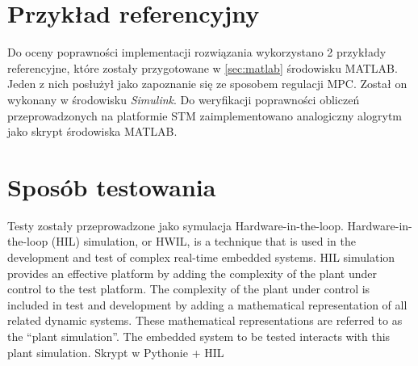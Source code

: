 \section{Przykład referencyjny} \label{sec:ref}
Do oceny poprawności implementacji rozwiązania wykorzystano 2 przykłady referencyjne, które zostały
przygotowane w \ref{sec:matlab} środowisku MATLAB. Jeden z nich posłużył jako zapoznanie się ze
sposobem regulacji MPC. Został on wykonany w środowisku \textit{Simulink}. 
Do weryfikacji poprawności obliczeń przeprowadzonych na platformie STM zaimplementowano analogiczny
alogrytm jako skrypt środowiska MATLAB.  

\section{Sposób testowania} \label{sec:tests}
Testy zostały przeprowadzone jako symulacja Hardware-in-the-loop.
Hardware-in-the-loop (HIL) simulation, or HWIL, is a technique that is used in the development
and test of complex real-time embedded systems. HIL simulation provides an effective platform 
by adding the complexity of the plant under control to the test platform. The complexity
of the plant under control is included in test and development by adding a mathematical
representation of all related dynamic systems. These mathematical representations are referred
to as the “plant simulation”. The embedded system to be tested interacts with this plant simulation.
Skrypt w Pythonie + HIL

